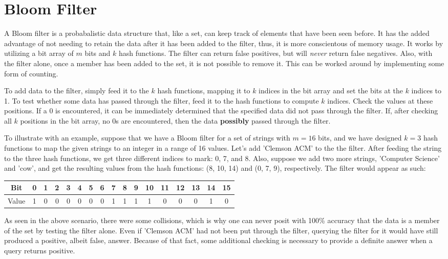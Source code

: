 \section{Bloom Filter}

A Bloom filter is a probabalistic data structure that, like a set, can keep track of elements that have been seen before.
It has the added advantage of not needing to retain the data after it has been added to the filter, thus, it is more conscientous of memory usage.
It works by utilizing a bit array of $m$ bits and $k$ hash functions.
The filter can return false positives, but will \textit{never} return false negatives.
Also, with the filter alone, once a member has been added to the set, it is not possible to remove it.
This can be worked around by implementing some form of counting.

To add data to the filter, simply feed it to the $k$ hash functions, mapping it to $k$ indices in the bit array and set the bits at the $k$ indices to 1.
To test whether some data has passed through the filter, feed it to the hash functions to compute $k$ indices.
Check the values at these positions.
If a 0 is encountered, it can be immediately determined that the specified data did not pass through the filter.
If, after checking all $k$ positions in the bit array, no 0s are encountered, then the data \textbf{possibly} passed through the filter.

To illustrate  with an example, suppose that we have a Bloom filter for a set of strings with $m = 16$ bits, and we have designed $k = 3$ hash functions to map the given strings to an integer in a range of 16 values.
Let's add 'Clemson ACM' to the the filter.
After feeding the string to the three hash functions, we get three different indices to mark: 0, 7, and 8.
Also, suppose we add two more strings, 'Computer Science' and 'cow', and get the resulting values from the hash functions: (8, 10, 14) and (0, 7, 9), respectively.
The filter would appear as such:

\begin{table}[h]
	\begin{center}
		\begin{tabular}{ | c | c | c | c | c | c | c | c | c | c | c | c | c | c | c | c | c | }
			\hline
			Bit		& 0 & 1 & 2 & 3 & 4 & 5 & 6 & 7 & 8 & 9 & 10 & 11 & 12 & 13 & 14 & 15 \\ \hline
			Value	& 1 & 0 & 0 & 0 & 0 & 0 & 0 & 1 & 1 & 1 & 1  & 0  & 0  & 0  & 1  & 0  \\ \hline
		\end{tabular}
	\end{center}
\end{table}

As seen in the above scenario, there were some collisions, which is why one can never posit with 100\% accuracy that the data is a member of the set by testing the filter alone.
Even if 'Clemson ACM' had not been put through the filter, querying the filter for it would have still produced a positive, albeit false, answer.
Because of that fact, some additional checking is necessary to provide a definite answer when a query returns positive.

